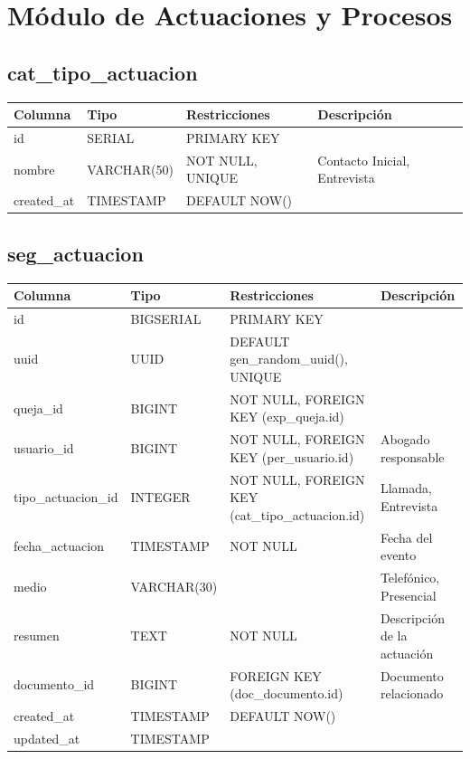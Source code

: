 \documentclass[12pt, a4paper]{article}
\begin{document}
\section{Módulo de Actuaciones y Procesos}
\label{sec:actuaciones}

\subsection{cat\_tipo\_actuacion}
\begin{longtable}{|p{3.5cm}|p{2.5cm}|p{3cm}|p{5cm}|}
    \hline
    \rowcolor[gray]{0.9}
    \textbf{Columna} & \textbf{Tipo} & \textbf{Restricciones} & \textbf{Descripción} \\
    \hline
    id & SERIAL & PRIMARY KEY & \\
    \hline
    nombre & VARCHAR(50) & NOT NULL, UNIQUE & Contacto Inicial, Entrevista \\
    \hline
    created\_at & TIMESTAMP & DEFAULT NOW() & \\
    \hline
\end{longtable}

\subsection{seg\_actuacion}
\begin{longtable}{|p{3.5cm}|p{2.5cm}|p{3cm}|p{5cm}|}
    \hline
    \rowcolor[gray]{0.9}
    \textbf{Columna} & \textbf{Tipo} & \textbf{Restricciones} & \textbf{Descripción} \\
    \hline
    id & BIGSERIAL & PRIMARY KEY & \\
    \hline
    uuid & UUID & DEFAULT gen\_random\_uuid(), UNIQUE & \\
    \hline
    queja\_id & BIGINT & NOT NULL, FOREIGN KEY (exp\_queja.id) & \\
    \hline
    usuario\_id & BIGINT & NOT NULL, FOREIGN KEY (per\_usuario.id) & Abogado responsable \\
    \hline
    tipo\_actuacion\_id & INTEGER & NOT NULL, FOREIGN KEY (cat\_tipo\_actuacion.id) & Llamada, Entrevista \\
    \hline
    fecha\_actuacion & TIMESTAMP & NOT NULL & Fecha del evento \\
    \hline
    medio & VARCHAR(30) & & Telefónico, Presencial \\
    \hline
    resumen & TEXT & NOT NULL & Descripción de la actuación \\
    \hline
    documento\_id & BIGINT & FOREIGN KEY (doc\_documento.id) & Documento relacionado \\
    \hline
    created\_at & TIMESTAMP & DEFAULT NOW() & \\
    \hline
    updated\_at & TIMESTAMP & & \\
    \hline
\end{longtable}
\end{document}
